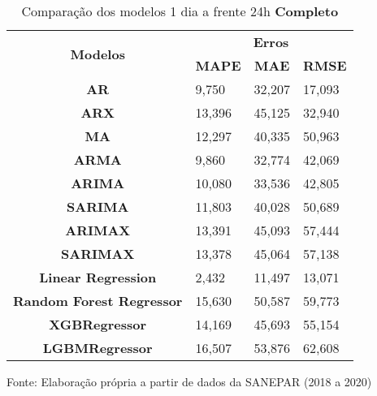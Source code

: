 \begin{table}[H]
	\centering
	\caption{Comparação dos modelos 1 dia a frente 24h \textbf{Completo} }\label{tb:1-24cm}
	\begin{tabular}{@{}clll@{}}
		\toprule
		\multirow{2}{*}{\textbf{Modelos}} & \multicolumn{3}{c}{\textbf{Erros}}                                                                       \\ \cmidrule(l){2-4} 
		& \multicolumn{1}{c}{\textbf{MAPE}} & \multicolumn{1}{c}{\textbf{MAE}} & \multicolumn{1}{c}{\textbf{RMSE}} \\ \hline
\textbf{AR}                       & 9,750                             & 32,207                           & 17,093                            \\
\textbf{ARX}                      & 13,396                            & 45,125                           & 32,940                            \\
\textbf{MA}                       & 12,297                            & 40,335                           & 50,963                            \\
\textbf{ARMA}                     & 9,860                             & 32,774                           & 42,069                            \\
\textbf{ARIMA}                    & 10,080                            & 33,536                           & 42,805                            \\
\textbf{SARIMA}                   & 11,803                            & 40,028                           & 50,689                            \\
\textbf{ARIMAX}                   & 13,391                            & 45,093                           & 57,444                            \\
\textbf{SARIMAX}                  & 13,378                            & 45,064                           & 57,138                            \\
\textbf{Linear Regression}        & 2,432                             & 11,497                           & 13,071                            \\
\textbf{Random Forest Regressor}  & 15,630                            & 50,587                           & 59,773                            \\
\textbf{XGBRegressor}             & 14,169                            & 45,693                           & 55,154                            \\
\textbf{LGBMRegressor}            & 16,507                            & 53,876                           & 62,608                            \\ \bottomrule
	\end{tabular}

Fonte: Elaboração própria a partir de dados da SANEPAR (2018 a 2020)
\end{table}



